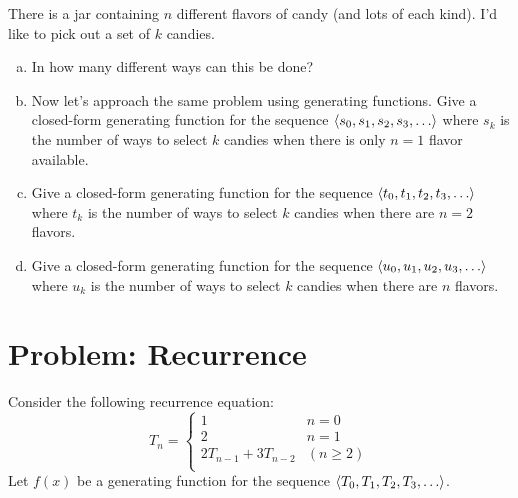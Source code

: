 \documentclass[12pt]{article}
\begin{document}
There is a jar containing $n$ different flavors of candy (and lots of each kind).  I'd like to
pick out a set of $k$ candies.

\begin{enumerate}[(a)]

\item In how many different ways can this be done?


\item Now let's approach the same problem using generating functions.
Give a closed-form generating function for the sequence $\left\langle s_0,
s_1, s_2, s_3, \ldots\right\rangle$ where $s_k$ is the number of ways to select
$k$ candies when there is only $n = 1$ flavor available.

\solution[\vspace{1.25in}]{
\[
1 + x + x^2 + x^3 + \ldots = \frac{1}{1-x}
\]
}

\item Give a closed-form generating function for the sequence
$\left\langle t_0, t_1, t_2, t_3, \ldots\right\rangle$ where $t_k$ is the number of ways
to select $k$ candies when there are $n = 2$ flavors.

\solution[\vspace{1.25in}]{
\[
(1 + x + x^2 + x^3 + \ldots)^2 = \frac{1}{(1-x)^2}
\]
}

\item Give a closed-form generating function for the sequence
$\left\langle u_0, u_1, u_2, u_3, \ldots\right\rangle$ where $u_k$ is the number of ways
to select $k$ candies when there are $n$ flavors.

\solution[\vspace{1.25in}]{
\[
\frac{1}{(1-x)^n}
\]
}

\end{enumerate}


\newpage

\section{Problem: Recurrence}

Consider the following recurrence equation:
%
\[
T_n =
\begin{cases}
1 & n = 0 \\
2 & n = 1 \\
2 T_{n-1} + 3 T_{n-2} & (n \geq 2) \\
\end{cases}
\]
%
Let $f(x)$ be a generating function for the sequence $\left\langle T_0, T_1,
T_2, T_3, \ldots\right\rangle$.
\end{document}
